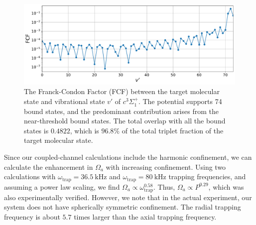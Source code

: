 \documentclass[aps,secnumarabic,amsmath,amssymb,10pt,superscriptaddress]{revtex4}
\newcommand{\todo}[1]{}
\begin{document}
\begin{figure}[ht!]
  \includegraphics[width=\textwidth]{imgs/fcf_c3sigma.pdf}
  \caption{The Franck-Condon Factor (FCF) between the target molecular state and vibrational state $v'$ of $c^3\Sigma^+_1$. The potential supports 74 bound states, and the predominant contribution arises from the near-threshold bound states. The total overlap with all the bound states is $0.4822$, which is $96.8\%$ of the total triplet fraction of the target molecular state.
    \label{f-smfcf}}
\end{figure}


Since our coupled-channel calculations include the harmonic confinement, we can calculate the enhancement in $\Omega_a$ with increasing confinement. Using two calculations with $ \omega_{\text{trap}} = 36.5~\mathrm{kHz}$ and $\omega_{\text{trap}} = 80~\mathrm{kHz}$ trapping frequencies, and assuming a power law scaling, we find $ \Omega_a \propto \omega_{\text{trap}}^{0.58} $. Thus, $\Omega_a \propto P^{0.29} $, which was also experimentally verified. However, we note that in the actual experiment, our system does not have spherically symmetric confinement. The radial trapping frequency is about $5.7$ times larger than the axial trapping frequency.
\todo{
  Power/intensity calibration
}


\end{document}
